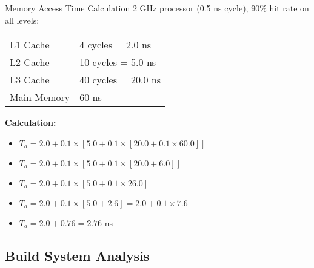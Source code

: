 \begin{example2}{Memory Access Time Calculation}
    2 GHz processor (0.5 ns cycle), 90\% hit rate on all levels:
    
    \begin{tabular}{|l|l|}
        \hline
        L1 Cache & 4 cycles = 2.0 ns \\
        L2 Cache & 10 cycles = 5.0 ns \\
        L3 Cache & 40 cycles = 20.0 ns \\
        Main Memory & 60 ns \\
        \hline
    \end{tabular}
    
    \tcblower
    
    \textbf{Calculation:}
    \begin{itemize}
        \item $T_a = 2.0 + 0.1 \times [5.0 + 0.1 \times [20.0 + 0.1 \times 60.0]]$
        \item $T_a = 2.0 + 0.1 \times [5.0 + 0.1 \times [20.0 + 6.0]]$
        \item $T_a = 2.0 + 0.1 \times [5.0 + 0.1 \times 26.0]$
        \item $T_a = 2.0 + 0.1 \times [5.0 + 2.6] = 2.0 + 0.1 \times 7.6$
        \item $T_a = 2.0 + 0.76 = 2.76$ ns
    \end{itemize}
\end{example2}

\subsection{Build System Analysis}

